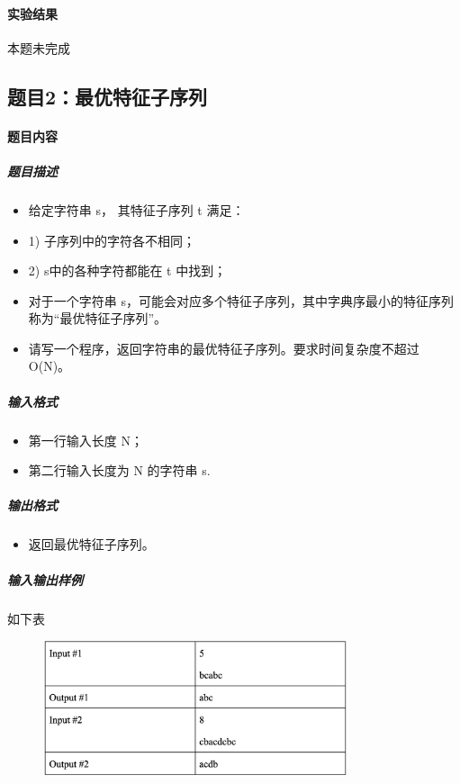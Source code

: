 \documentclass[12pt,a4paper]{ctexart}
\begin{document}
\vspace{5pt}

\paragraph{实验结果}
本题未完成

\newpage

\subsection*{题目2：最优特征子序列}
\paragraph{题目内容}
\subparagraph{题目描述}
\begin{itemize}
    \item 给定字符串 s， 其特征子序列 t 满足：
    \item 1) 子序列中的字符各不相同；
    \item 2) s中的各种字符都能在 t 中找到；
    \item 对于一个字符串 s，可能会对应多个特征子序列，其中字典序最小的特征序列称为“最优特征子序列”。
    \item 请写一个程序，返回字符串的最优特征子序列。要求时间复杂度不超过O(N)。
\end{itemize}

\subparagraph{输入格式}
    \begin{itemize}
        \item 第一行输入长度 N；
        \item 第二行输入长度为 N 的字符串 s.

    \end{itemize}

\subparagraph{输出格式}
    \begin{itemize}
        \item 返回最优特征子序列。
    \end{itemize}
    
\subparagraph{输入输出样例}
如下表
    \begin{figure}[h]
        \centering
        \includegraphics[width=0.80\textwidth]{q2_iodata.png}
    \end{figure}
\end{document}

